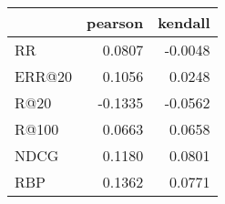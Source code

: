 \begin{tabular}{lrr}
\toprule
{} &  pearson &  kendall \\
\midrule
RR     &   0.0807 &  -0.0048 \\
ERR@20 &   0.1056 &   0.0248 \\
R@20   &  -0.1335 &  -0.0562 \\
R@100  &   0.0663 &   0.0658 \\
NDCG   &   0.1180 &   0.0801 \\
RBP    &   0.1362 &   0.0771 \\
\bottomrule
\end{tabular}
